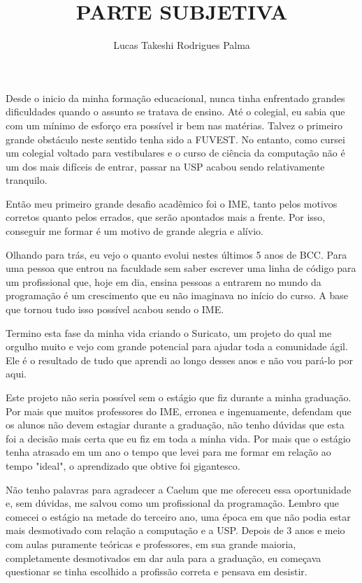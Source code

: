 \documentclass[titlepage,a4paper]{article}
\title{PARTE SUBJETIVA}
\author{Lucas Takeshi Rodrigues Palma}
\newcommand{\suricato}{Suricato}
\begin{document}
\maketitle

Desde o inicio da minha formação educacional, nunca tinha enfrentado grandes dificuldades quando o assunto se tratava de ensino. Até o colegial, eu sabia que com um mínimo de esforço era possível ir bem nas matérias. Talvez o primeiro grande obstáculo neste sentido tenha sido a FUVEST. No entanto, como cursei um colegial voltado para vestibulares e o curso de ciência da computação não é um dos mais difíceis de entrar, passar na USP acabou sendo relativamente tranquilo.

Então meu primeiro grande desafio acadêmico foi o IME, tanto pelos motivos corretos quanto pelos errados, que serão apontados mais a frente. Por isso, conseguir me formar é um motivo de grande alegria e alívio.

Olhando para trás, eu vejo o quanto evolui nestes últimos 5 anos de BCC. Para uma pessoa que entrou na faculdade sem saber escrever uma linha de código para um profissional que, hoje em dia, ensina pessoas a entrarem no mundo da programação é um crescimento que eu não imaginava no início do curso. A base que tornou tudo isso possível acabou sendo o IME.

Termino esta fase da minha vida criando o \suricato{}, um projeto do qual me orgulho muito e vejo com grande potencial para ajudar toda a comunidade ágil. Ele é o resultado de tudo que aprendi ao longo desses anos e não vou pará-lo por aqui.

Este projeto não seria possível sem o estágio que fiz durante a minha graduação. Por mais que muitos professores do IME, erronea e ingenuamente, defendam que os alunos não devem estagiar durante a graduação, não tenho dúvidas que esta foi a decisão mais certa que eu fiz em toda a minha vida. Por mais que o estágio tenha atrasado em um ano o tempo que levei para me formar em relação ao tempo "ideal", o aprendizado que obtive foi gigantesco.

Não tenho palavras para agradecer a Caelum que me ofereceu essa oportunidade e, sem dúvidas, me salvou como um profissional da programação. Lembro que comecei o estágio na metade do terceiro ano, uma época em que não podia estar mais desmotivado com relação a computação e a USP. Depois de 3 anos e meio com aulas puramente teóricas e professores, em sua grande maioria, completamente desmotivados em dar aula para a graduação, eu começava questionar se tinha escolhido a profissão correta e pensava em desistir. 
\end{document}
